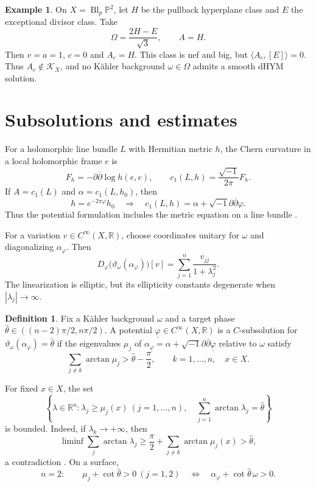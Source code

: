 \documentclass[12pt,reqno]{amsart}
\numberwithin{equation}{section}
\theoremstyle{plain}
\theoremstyle{definition}
\newtheorem{definition}[theorem]{Definition}
\newtheorem{example}[theorem]{Example}
\newcommand{\ddbar}{\sqrt{-1}\partial\overline{\partial}}
\newcommand{\cK}{\mathcal K}
\newcommand{\R}{\mathbb R}
\newcommand{\bbP}{\mathbb P}
\begin{document}
\begin{example}\label{ex-nef-boundary-class}
On $X=\operatorname{Bl}_p\bbP^2$, let $H$ be the pullback hyperplane
class and $E$ the exceptional divisor class. Take
\[
 \Omega=\frac{2H-E}{\sqrt3},\qquad A=H.
\]
Then $v=a=1$, $c=0$ and $A_c=H$. This class is nef and big, but
$\langle A_c,[E]\rangle=0$. Thus $A_c\notin\cK_X$, and no K\"ahler
background $\omega\in\Omega$ admits a smooth dHYM solution.
\end{example}

\section{Subsolutions and estimates}\label{subsolutions-and-estimates}
For a holomorphic line bundle $L$ with Hermitian metric $h$, the Chern
curvature in a local holomorphic frame $e$ is
\[
 F_h=-\partial\overline\partial\log h(e,e),\qquad
 c_1(L,h)=\frac{\sqrt{-1}}{2\pi}F_h.
\]
If $A=c_1(L)$ and $\alpha=c_1(L,h_0)$, then
\[
 h=e^{-2\pi\varphi}h_0
 \quad\Longrightarrow\quad c_1(L,h)=\alpha+\ddbar\varphi.
\]
Thus the potential formulation includes the metric equation on a line
bundle \cite{JY17}.


For a variation $v\in C^\infty(X,\R)$, choose coordinates unitary for
$\omega$ and diagonalizing $\alpha_\varphi$. Then
\[
 D_\varphi\bigl(\vartheta_\omega(\alpha_\varphi)\bigr)[v]
 =\sum_{j=1}^n\frac{v_{j\overline j}}{1+\lambda_j^2}.
\]
The linearization is elliptic, but its ellipticity constants degenerate
when $|\lambda_j|\to\infty$.

\begin{definition}\label{def-smooth-subsolution}
Fix a K\"ahler background $\omega$ and a target phase
$\widehat\theta\in((n-2)\pi/2,n\pi/2)$.
A potential $\underline\varphi\in C^\infty(X,\R)$ is a
$C$-subsolution for $\vartheta_\omega(\alpha_\varphi)=\widehat\theta$
if the eigenvalues $\mu_j$ of
$\alpha_{\underline\varphi}=\alpha+\ddbar\underline\varphi$
relative to $\omega$ satisfy
\[
 \sum_{j\ne k}\arctan\mu_j>\widehat\theta-\frac\pi2,
 \qquad k=1,\ldots,n,\quad x\in X.
\]
\end{definition}

For fixed $x\in X$, the set
\[
 \left\{\lambda\in\R^n:\lambda_j\geq\mu_j(x)\ (j=1,\ldots,n),\quad
 \sum_{j=1}^n\arctan\lambda_j=\widehat\theta\right\}
\]
is bounded. Indeed, if $\lambda_k\to+\infty$, then
\[
 \liminf\sum_j\arctan\lambda_j
 \geq\frac\pi2+\sum_{j\ne k}\arctan\mu_j(x)>\widehat\theta,
\]
a contradiction \cite[Lemma 3.3]{CJY20}.
On a surface,
\[
 n=2:\qquad \mu_j+\cot\widehat\theta>0\ (j=1,2)
 \quad\Longleftrightarrow\quad
 \alpha_{\underline\varphi}+\cot\widehat\theta\,\omega>0.
\]
\end{document}
